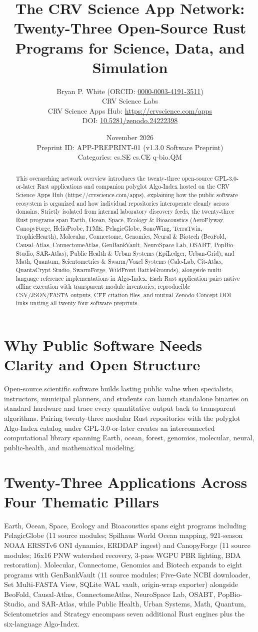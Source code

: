 \documentclass[10pt,letterpaper]{article}
\title{\textbf{The CRV Science App Network: Twenty-Three Open-Source Rust Programs for Science, Data, and Simulation}}
\author{Bryan P. White (ORCID: \href{https://orcid.org/0000-0003-4191-3511}{0000-0003-4191-3511}) \\ CRV Science Labs \\ \small CRV Science Apps Hub: \url{https://crvscience.com/apps} \\ \small DOI: \href{https://doi.org/10.5281/zenodo.24222398}{10.5281/zenodo.24222398}}
\date{November 2026 \\ \small Preprint ID: APP-PREPRINT-01 (v1.3.0 Software Preprint) \\ \small Categories: cs.SE \textbullet{} cs.CE \textbullet{} q-bio.QM}
\begin{document}
\maketitle

\begin{abstract}
This overarching network overview introduces the twenty-three open-source GPL-3.0-or-later Rust applications and companion polyglot Algo-Index hosted on the CRV Science Apps Hub (https://crvscience.com/apps), explaining how the public software ecosystem is organized and how individual repositories interoperate cleanly across domains. Strictly isolated from internal laboratory discovery feeds, the twenty-three Rust programs span Earth, Ocean, Space, Ecology \& Bioacoustics (AeroFlyway, CanopyForge, HelioProbe, ITME, PelagicGlobe, SonoWing, TerraTwin, TrophicHearth), Molecular, Connectome, Genomics, Neural \& Biotech (BeoFold, Causal-Atlas, ConnectomeAtlas, GenBankVault, NeuroSpace Lab, OSABT, PopBio-Studio, SAR-Atlas), Public Health \& Urban Systems (EpiLedger, Urban-Grid), and Math, Quantum, Scientometrics \& Swarm/Voxel Systems (Calc-Lab, Cit-Atlas, QuantaCrypt-Studio, SwarmForge, WildFront BattleGrounds), alongside multi-language reference implementations in Algo-Index. Each Rust application pairs native offline execution with transparent module inventories, reproducible CSV/JSON/FASTA outputs, CFF citation files, and mutual Zenodo Concept DOI links uniting all twenty-four software preprints.
\end{abstract}

\section{Why Public Software Needs Clarity and Open Structure}
Open-source scientific software builds lasting public value when specialists, instructors, municipal planners, and students can launch standalone binaries on standard hardware and trace every quantitative output back to transparent algorithms. Pairing twenty-three modular Rust repositories with the polyglot Algo-Index catalog under GPL-3.0-or-later creates an interconnected computational library spanning Earth, ocean, forest, genomics, molecular, neural, public-health, and mathematical modeling.

\section{Twenty-Three Applications Across Four Thematic Pillars}
Earth, Ocean, Space, Ecology and Bioacoustics spans eight programs including PelagicGlobe (11 source modules; Spilhaus World Ocean mapping, 921-season NOAA ERSSTv6 ONI dynamics, ERDDAP ingest) and CanopyForge (11 source modules; 16x16 PNW watershed recovery, 3-pass WGPU PBR lighting, BDA restoration). Molecular, Connectome, Genomics and Biotech expands to eight programs with GenBankVault (11 source modules; Five-Gate NCBI downloader, Set Multi-FASTA View, SQLite WAL vault, origin-wrap exporter) alongside BeoFold, Causal-Atlas, ConnectomeAtlas, NeuroSpace Lab, OSABT, PopBio-Studio, and SAR-Atlas, while Public Health, Urban Systems, Math, Quantum, Scientometrics and Strategy encompass seven additional Rust engines plus the six-language Algo-Index.
\end{document}
